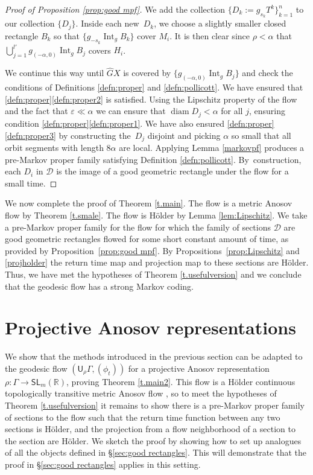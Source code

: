\documentclass[11pt]{article}
\let\mathcal\mathscr
\let\epsilon\varepsilon
\theoremstyle{definition}
\numberwithin{equation}{section}
\DeclareMathOperator{\diam}{diam}
\DeclareMathOperator{\Int}{Int}
\newcommand\DDD{\mathcal D}
\begin{document}
\begin{proof}[Proof of Proposition \ref{prop:good mpf}]
We add the collection $\{ D_k\!:=\!g_{s_k}T^k \}_{k=1}^n$ to our collection $\{D_j\}$. Inside each new~$D_k$, we choose a slightly smaller closed rectangle $B_k$ so that $\{ g_{-s_k} \Int_g B_k \}$ cover $M_i$. It is then clear since $\rho<\alpha$ that $\bigcup_{j=1}^{l'} g_{(-\alpha,0)} \Int_g B_j$ covers $H_i$.

We continue this way until $\hat GX$ is covered by $\{ g_{(-\alpha,0)} \Int_g B_j \}$ and check the conditions of Definitions \ref{defn:proper} and \ref{defn:pollicott}. We have ensured that \ref{defn:proper}\eqref{defn:proper2} is satisfied. Using the Lipschitz property of the flow and the fact that $\epsilon \ll  \alpha$ we can ensure that $\diam D_j < \alpha$ for all $j$, ensuring condition \ref{defn:proper}\eqref{defn:proper1}. We have also ensured \ref{defn:proper}\eqref{defn:proper3} by constructing the~$D_j$ disjoint and picking $\alpha$ so small that all orbit segments with length $8\alpha$ are local. \hbox{Applying} Lemma \ref{markovpf} produces a pre-Markov proper family satisfying Definition \ref{defn:pollicott}. By~construction, each $D_i$ in $\mathcal{D}$ is the image of a good geometric rectangle under the flow for a small time.
\end{proof}

We now complete the proof of Theorem \ref{t.main}. The flow is a metric Anosov flow by Theorem \ref{t.smale}. The flow is Hölder by Lemma \ref{lem:Lipschitz}. We take a pre-Markov proper family for the flow for which the family of sections $\DDD$ are good geometric rectangles flowed for some short constant amount of time, as provided by Proposition~\ref{prop:good mpf}. By Propositions~\ref{prop:Lipschitz} and \ref{projholder} the return time map and projection map to these sections are Hölder. Thus, we have met the hypotheses of Theorem \ref{t.usefulversion} and we conclude that the geodesic flow has a strong Markov coding.

\section{Projective Anosov representations} \label{sec:twoexamples}

We show that the methods introduced in the previous section can be adapted to the geodesic flow $(\mathsf{U}_\rho\Gamma, (\phi_t))$ for a projective Anosov representation $\rho: \Gamma \to \mathsf{SL}_m(\mathbb{R})$, proving Theorem \ref{t.main2}. This flow is a Hölder continuous topologically transitive metric Anosov flow \cite[Prop.\,5.1]{bcls}, so to meet the hypotheses of Theorem \ref{t.usefulversion} it remains to show there is a pre-Markov proper family of sections to the flow such that the return time function between any two sections is Hölder, and the projection from a flow neighborhood of a section to the section are Hölder. We sketch the proof by showing how to set up analogues of all the objects defined in \S \ref{sec:good rectangles}. This will demonstrate that the proof in \S \ref{sec:good rectangles} applies in this setting.
\end{document}
